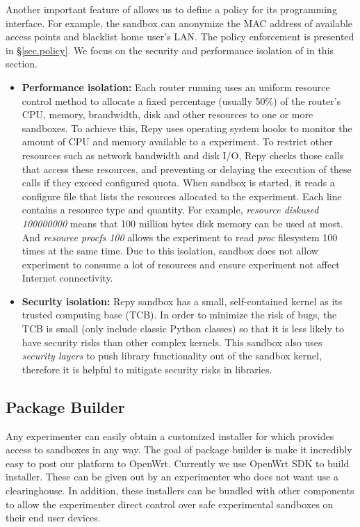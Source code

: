Another important feature of \sandboxname allows us to define a policy for its programming interface. For example, the sandbox can anonymize the MAC address of available access points and blacklist home user's LAN. The policy enforcement is presented in \S{\ref{sec.policy}}. We focus on the security and performance isolation of \sandboxname in this section.
\begin{itemize}
\item \textbf{Performance isolation: }Each router running \sysname uses an uniform resource control method to allocate a fixed percentage (usually 50\%) of the router's CPU, memory, brandwidth, disk and other resources to one or more sandboxes. To achieve this, Repy uses operating system hooks to monitor the amount of CPU and memory available to a experiment. To restrict other resources such as network bandwidth and disk I/O, Repy checks those calls that access these resources, and preventing or delaying the execution of these calls if they exceed configured quota. When sandbox is started, it reads a configure file that lists the resources allocated to the experiment. Each line contains a resource type and quantity. For example, \textit{resource diskused 100000000} means that 100 million bytes disk memory can be used at most. And \textit{resource procfs 100} allows the experiment to read \textit{proc} filesystem 100 times at the same time. Due to this isolation, sandbox does not allow experiment to consume a lot of resources and ensure experiment not affect Internet connectivity.

\item \textbf{Security isolation: }Repy sandbox has a small, self-contained kernel as its trusted computing base (TCB). In order to minimize the risk of bugs, the TCB is small (only include classic Python classes) so that it is less likely to have security risks than other complex kernels. This sandbox also uses \textit{security layers} to push library functionality out of the sandbox kernel, therefore it is helpful to mitigate security risks in libraries. 

\end{itemize}
\subsection{Package Builder}
\label{sec.packagebuilder}
Any experimenter can easily obtain a customized installer for \sysname which provides access to sandboxes in any way. The goal of package builder is make it incredibly easy to post our platform to OpenWrt. Currently we use OpenWrt SDK to build installer. These can be given out by an experimenter who does not want use a clearinghouse. In addition, these installers can be bundled with other components to allow the experimenter direct control over safe experimental sandboxes on their end user devices.

